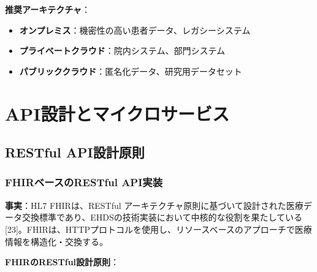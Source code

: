 \documentclass[
  a4paper,
  a4paper,
  11pt]{ltjsbook}
\providecommand{\tightlist}{%
  \setlength{\itemsep}{0pt}\setlength{\parskip}{0pt}}
\begin{document}
\textbf{推奨アーキテクチャ}：

\begin{itemize}
\tightlist
\item
  \textbf{オンプレミス}：機密性の高い患者データ、レガシーシステム
\item
  \textbf{プライベートクラウド}：院内システム、部門システム
\item
  \textbf{パブリッククラウド}：匿名化データ、研究用データセット
\end{itemize}

\section{API設計とマイクロサービス}\label{apiux8a2dux8a08ux3068ux30deux30a4ux30afux30edux30b5ux30fcux30d3ux30b9}

\subsection{RESTful
API設計原則}\label{restful-apiux8a2dux8a08ux539fux5247}

\subsubsection{FHIRベースのRESTful
API実装}\label{fhirux30d9ux30fcux30b9ux306erestful-apiux5b9fux88c5}

\textbf{事実}：HL7 FHIRは、RESTful
アーキテクチャ原則に基づいて設計された医療データ交換標準であり、EHDSの技術実装において中核的な役割を果たしている{[}23{]}。FHIRは、HTTPプロトコルを使用し、リソースベースのアプローチで医療情報を構造化・交換する。

\textbf{FHIRのRESTful設計原則}：
\end{document}
